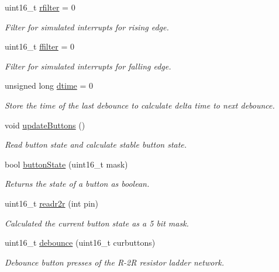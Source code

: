 \begin{DoxyCompactItemize}
uint16\+\_\+t \hyperlink{group__buttons_ga541db091bf54e0a51180f3666e5a2ce2}{rfilter} = 0
\begin{DoxyCompactList}\small\item\em Filter for simulated interrupts for rising edge. \end{DoxyCompactList}\item 
uint16\+\_\+t \hyperlink{group__buttons_gaaa75cede053f94cf46d7420556af1505}{ffilter} = 0
\begin{DoxyCompactList}\small\item\em Filter for simulated interrupts for falling edge. \end{DoxyCompactList}\item 
unsigned long \hyperlink{group__buttons_ga94921f7ca95d518d3deabb1da432c2fb}{dtime} = 0
\begin{DoxyCompactList}\small\item\em Store the time of the last debounce to calculate delta time to next debounce. \end{DoxyCompactList}\item 
void \hyperlink{group__buttons_gaf32fa88edc93b34e25f058e331ea1134}{update\+Buttons} ()
\begin{DoxyCompactList}\small\item\em Read button state and calculate stable button state. \end{DoxyCompactList}\item 
bool \hyperlink{group__buttons_gad4a8f6035320735a6ed69364c0f29d63}{button\+State} (uint16\+\_\+t mask)
\begin{DoxyCompactList}\small\item\em Returns the state of a button as boolean. \end{DoxyCompactList}\item 
uint16\+\_\+t \hyperlink{group__buttons_ga5421761bb5d1c3470d3b17196a438c80}{readr2r} (int pin)
\begin{DoxyCompactList}\small\item\em Calculated the current button state as a 5 bit mask. \end{DoxyCompactList}\item 
uint16\+\_\+t \hyperlink{group__buttons_ga0ce7c5a698df341a0f3882378518f562}{debounce} (uint16\+\_\+t curbuttons)
\begin{DoxyCompactList}\small\item\em Debounce button presses of the R-\/2R resistor ladder network. \end{DoxyCompactList}\item 

\end{DoxyCompactItemize}
